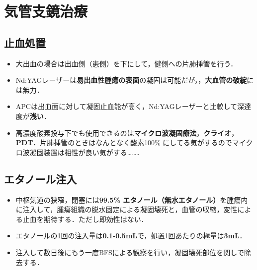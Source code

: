 \newpage


\section{気管支鏡治療}
\subsection{止血処置}
\begin{itemize}
\item 大出血の場合は出血側（患側）を下にして，健側への片肺挿管を行う．
\item Nd:YAGレーザーは\textbf{易出血性腫瘍の表面}の凝固は可能だが，，\textbf{大血管の破綻}には無力．
\item APCは出血面に対して凝固止血能が高く，Nd:YAGレーザーと比較して深達度が\textbf{浅い}．
\item 高濃度酸素投与下でも使用できるのは\textbf{マイクロ波凝固療法}，\textbf{クライオ}，\textbf{PDT}．片肺挿管のときはなんとなく酸素100\% にしてる気がするのでマイクロ波凝固装置は相性が良い気がする……．
\end{itemize}

\subsection{エタノール注入}
\begin{itemize}

\item 中枢気道の狭窄，閉塞には\textbf{99.5\% エタノール（無水エタノール）}を腫瘍内に注入して，腫瘍組織の脱水固定による凝固壊死と，血管の収縮，変性による止血を期待する．ただし即効性はない．
\item エタノールの1回の注入量は\textbf{0.1-0.5mL}で，処置1回あたりの極量は\textbf{3mL}．
\item 注入して数日後にもう一度BFSによる観察を行い，凝固壊死部位を関しで除去する．
\end{itemize}

